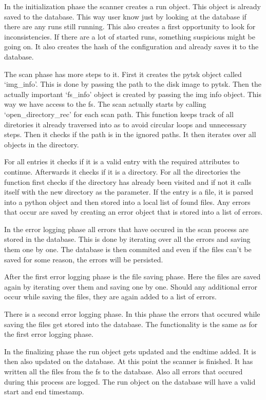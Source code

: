 \documentclass[
	a4paper,					%
	10pt,							%
	twoside,					%
	openright,				%
	notitlepage,			%
	parskip=half,			%
]{scrreprt}					%
\begin{document}
In the initialization phase the scanner creates a run object. This object is already saved to the database. This way user know just by looking at the database if there are any runs still running. This also creates a first opportunity to look for inconsistencies. If there are a lot of started runs, something suspicious might be going on. It also creates the hash of the configuration and already saves it to the database.

The scan phase has more steps to it. First it creates the \gls{pytsk} object called `img\_info'. This is done by passing the path to the disk image to \gls{pytsk}. Then the actually important `fs\_info' object is created by passing the img info object. This way we have access to the \gls{fs}. The scan actually starts by calling `open\_directory\_rec' for each scan path. This function keeps track of all diretories it already traversed into as to avoid circular loops and unnecessary steps. Then it checks if the path is in the ignored paths. It then iterates over all objects in the directory. 

For all entries it checks if it is a valid entry with the required attributes to continue. Afterwards it checks if it is a directory. For all the directories the function first checks if the directory has already been visited and if not it calls itself with the new directory as the parameter. If the entry is a file, it is parsed into a python object and then stored into a local list of found files. Any errors that occur are saved by creating an error object that is stored into a list of errors.

In the error logging phase all errors that have occured in the scan process are stored in the database. This is done by iterating over all the errors and saving them one by one. The database is then commited and even if the files can't be saved for some reason, the errors will be persisted.

After the first error logging phase is the file saving phase. Here the files are saved again by iterating over them and saving one by one. Should any additional error occur while saving the files, they are again added to a list of errors. 

There is a second error logging phase. In this phase the errors that occured while saving the files get stored into the database. The functionality is the same as for the first error logging phase.

In the finalizing phase the run object gets updated and the endtime added. It is then also updated on the database. At this point the scanner is finished. It has written all the files from the \gls{fs} to the database. Also all errors that occured during this process are logged. The run object on the database will have a valid start and end timestamp. 
\end{document}
